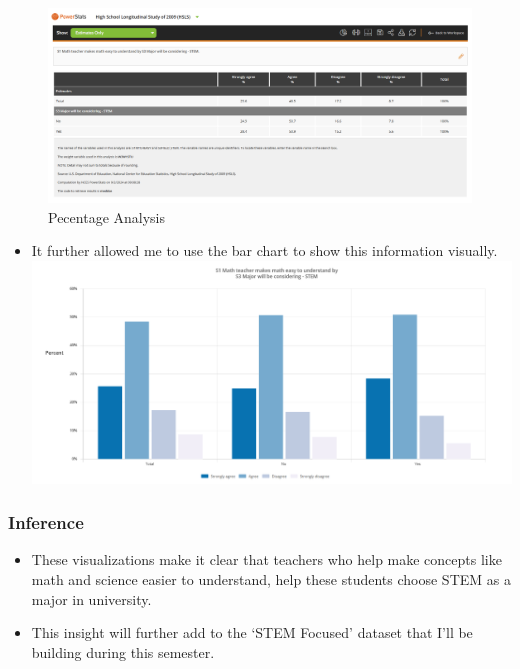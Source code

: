 \documentclass[
  letterpaper,
  DIV=11,
  numbers=noendperiod]{scrreprt}
\providecommand{\tightlist}{%
  \setlength{\itemsep}{0pt}\setlength{\parskip}{0pt}}\usepackage{longtable,booktabs,array}
\begin{document}
\begin{figure}[H]

{\centering \includegraphics{./Excel_1_Unit/Week1_Chris/stem_math_visualization.png}

}

\caption{Pecentage Analysis}

\end{figure}%

\begin{itemize}
\tightlist
\item
  It further allowed me to use the bar chart to show this information
  visually.
  \includegraphics{./Excel_1_Unit/Week1_Chris/stem_math_chart.png}
\end{itemize}

\subsubsection{Inference}\label{inference}

\begin{itemize}
\tightlist
\item
  These visualizations make it clear that teachers who help make
  concepts like math and science easier to understand, help these
  students choose STEM as a major in university.
\item
  This insight will further add to the `STEM Focused' dataset that I'll
  be building during this semester.
\end{itemize}
\end{document}
